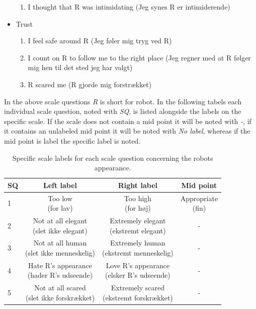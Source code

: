 \begin{itemize}
\begin{enumerate}
  \item I thought that R was intimidating (Jeg synes R er intimiderende)
\end{enumerate}
\item Trust 
\begin{enumerate}
  \item I feel safe around R (Jeg føler mig tryg ved R)
  \item I count on R to follow me to the right place (Jeg regner med at R følger mig hen til det sted jeg har valgt)
  \item R scared me (R gjorde mig forstrækket)\\
\end{enumerate}
\end{itemize}
%
In the above scale questions \textit{R} is short for robot. In the following tabels each individual scale question, noted with \textit{SQ}, is listed alongside the labels on the specific scale. If the scale does not contain a mid point it will be noted with \textit{-}, if it contains an unlabeled mid point it will be noted with \textit{No label}, whereas if the mid point is label the specific label is noted. 
%
\begin{table}[H]
	\centering
	\begin{tabular}{l|c|c|c}
		SQ     & Left label & Right label & Mid point \\\hline
		1   & \makecell{Too low \\(for lav)} & \makecell{Too high \\(for høj)} & \makecell{Appropriate \\(fin)}         \\\hline
		2   & \makecell{Not at all elegant \\(slet ikke elegant)} & \makecell{Extremely elegant \\(ekstremt elegant)} & -         \\\hline
		3   & \makecell{Not at all human \\(slet ikke menneskelig)} & \makecell{Extremely human \\(ekstremt menneskelig)} & -         \\\hline
	 	4   & \makecell{Hate R's appearance \\(hader R's udseende)} & \makecell{Love R's appearance \\(elsker R's udseende)} & -         \\\hline
		5   & \makecell{Not at all scared \\(slet ikke forskrækket)} & \makecell{Extremely scared \\(ekstremt forskrækket)} & -           
	\end{tabular}
	\caption{Specific scale labels for each scale question concerning the robots appearance.}
	\label{tab:AppearanceScale}         
\end{table}
\noindent
%

